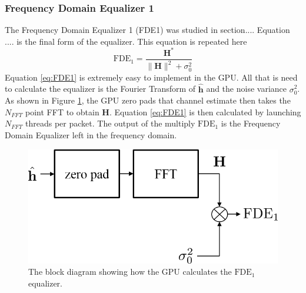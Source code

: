 \subsubsection{Frequency Domain Equalizer 1}
The Frequency Domain Equalizer 1 (FDE1) was studied in section....
Equation .... is the final form of the equalizer.
This equation is repeated here
\begin{equation}
\text{FDE}_1 = \frac{\mathbf{H}^*}{\|\mathbf{H}\|^2 + \sigma_0^2}
\label{eq:FDE1}
\end{equation}
Equation \eqref{eq:FDE1} is extremely easy to implement in the GPU.
All that is need to calculate the equalizer is the Fourier Transform of $\hat{\mathbf{h}}$ and the noise variance $\sigma_0^2$.
As shown in Figure \ref{fig:FDE1_block}, the GPU zero pads that channel estimate then takes the $N_{FFT}$ point FFT to obtain $\mathbf{H}$.
Equation \eqref{eq:FDE1} is then calculated by launching $N_{FFT}$ threads per packet.
The output of the multiply $\text{FDE}_1$ is the Frequency Domain Equalizer left in the  frequency domain.
\begin{figure}
	\centering\includegraphics[width=\textwidth/10*5]{figures/gpu/FDE1_block.png}
	\caption{The block diagram showing how the GPU calculates the $\text{FDE}_1$ equalizer.}
	\label{fig:FDE1_block}
\end{figure}

